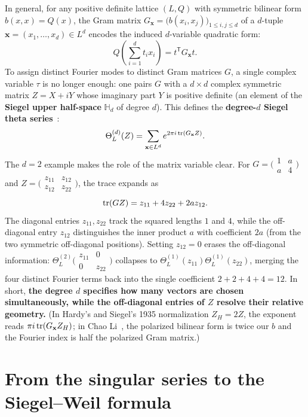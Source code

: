 In general, for any positive definite lattice $(L,Q)$ with symmetric bilinear form $b(x,x)=Q(x)$, the Gram matrix $G_{\mathbf x}=\bigl(b(x_i,x_j)\bigr)_{1\le i,j\le d}$ of a $d$-tuple $\mathbf x=(x_1,\ldots,x_d)\in L^d$ encodes the induced $d$-variable quadratic form:
\[
Q\!\left(\sum_{i=1}^{d} t_i x_i\right)=t^{\mathsf T}G_{\mathbf x}t.
\]
To assign distinct Fourier modes to distinct Gram matrices $G$, a single complex variable $\tau$ is no longer enough: one pairs $G$ with a $d\times d$ complex symmetric matrix $Z=X+iY$ whose imaginary part $Y$ is positive definite (an element of the \textbf{Siegel upper half-space} $\mathbb H_d$ of degree $d$). This defines the \textbf{degree-$d$ Siegel theta series}~\cite[Definition~2.1.1]{Li2023}:
\[
\Theta_L^{(d)}(Z)=\sum_{\mathbf x\in L^d}e^{2\pi i\operatorname{tr}(G_{\mathbf x}Z)}.
\]
The $d=2$ example makes the role of the matrix variable clear. For $G=\bigl(\begin{smallmatrix}1&a\\a&4\end{smallmatrix}\bigr)$ and $Z=\bigl(\begin{smallmatrix}z_{11}&z_{12}\\z_{12}&z_{22}\end{smallmatrix}\bigr)$, the trace expands as
\[
\operatorname{tr}(GZ)=z_{11}+4z_{22}+2az_{12}.
\]
The diagonal entries $z_{11},z_{22}$ track the squared lengths $1$ and $4$, while the off-diagonal entry $z_{12}$ distinguishes the inner product $a$ with coefficient $2a$ (from the two symmetric off-diagonal positions). Setting $z_{12}=0$ erases the off-diagonal information: $\Theta_L^{(2)}\!\bigl(\begin{smallmatrix}z_{11}&0\\0&z_{22}\end{smallmatrix}\bigr)$ collapses to $\Theta_L^{(1)}(z_{11})\Theta_L^{(1)}(z_{22})$, merging the four distinct Fourier terms back into the single coefficient $2+2+4+4=12$. In short, \textbf{the degree $d$ specifies how many vectors are chosen simultaneously, while the off-diagonal entries of $Z$ resolve their relative geometry.} (In Hardy's and Siegel's 1935 normalization $Z_H=2Z$, the exponent reads $\pi i\operatorname{tr}(G_{\mathbf x}Z_H)$; in Chao Li~\cite{Li2023}, the polarized bilinear form is twice our $b$ and the Fourier index is half the polarized Gram matrix.)

\section{From the singular series to the Siegel--Weil formula}

